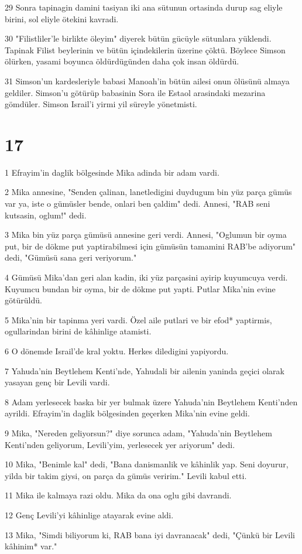 \par 29 Sonra tapinagin damini tasiyan iki ana sütunun ortasinda durup sag eliyle birini, sol eliyle ötekini kavradi.
\par 30 "Filistliler'le birlikte öleyim" diyerek bütün gücüyle sütunlara yüklendi. Tapinak Filist beylerinin ve bütün içindekilerin üzerine çöktü. Böylece Simson ölürken, yasami boyunca öldürdügünden daha çok insan öldürdü.
\par 31 Simson'un kardesleriyle babasi Manoah'in bütün ailesi onun ölüsünü almaya geldiler. Simson'u götürüp babasinin Sora ile Estaol arasindaki mezarina gömdüler. Simson Israil'i yirmi yil süreyle yönetmisti.

\chapter{17}

\par 1 Efrayim'in daglik bölgesinde Mika adinda bir adam vardi.
\par 2 Mika annesine, "Senden çalinan, lanetledigini duydugum bin yüz parça gümüs var ya, iste o gümüsler bende, onlari ben çaldim" dedi. Annesi, "RAB seni kutsasin, oglum!" dedi.
\par 3 Mika bin yüz parça gümüsü annesine geri verdi. Annesi, "Oglumun bir oyma put, bir de dökme put yaptirabilmesi için gümüsün tamamini RAB'be adiyorum" dedi, "Gümüsü sana geri veriyorum."
\par 4 Gümüsü Mika'dan geri alan kadin, iki yüz parçasini ayirip kuyumcuya verdi. Kuyumcu bundan bir oyma, bir de dökme put yapti. Putlar Mika'nin evine götürüldü.
\par 5 Mika'nin bir tapinma yeri vardi. Özel aile putlari ve bir efod* yaptirmis, ogullarindan birini de kâhinlige atamisti.
\par 6 O dönemde Israil'de kral yoktu. Herkes diledigini yapiyordu.
\par 7 Yahuda'nin Beytlehem Kenti'nde, Yahudali bir ailenin yaninda geçici olarak yasayan genç bir Levili vardi.
\par 8 Adam yerlesecek baska bir yer bulmak üzere Yahuda'nin Beytlehem Kenti'nden ayrildi. Efrayim'in daglik bölgesinden geçerken Mika'nin evine geldi.
\par 9 Mika, "Nereden geliyorsun?" diye sorunca adam, "Yahuda'nin Beytlehem Kenti'nden geliyorum, Levili'yim, yerlesecek yer ariyorum" dedi.
\par 10 Mika, "Benimle kal" dedi, "Bana danismanlik ve kâhinlik yap. Seni doyurur, yilda bir takim giysi, on parça da gümüs veririm." Levili kabul etti.
\par 11 Mika ile kalmaya razi oldu. Mika da ona oglu gibi davrandi.
\par 12 Genç Levili'yi kâhinlige atayarak evine aldi.
\par 13 Mika, "Simdi biliyorum ki, RAB bana iyi davranacak" dedi, "Çünkü bir Levili kâhinim* var."

